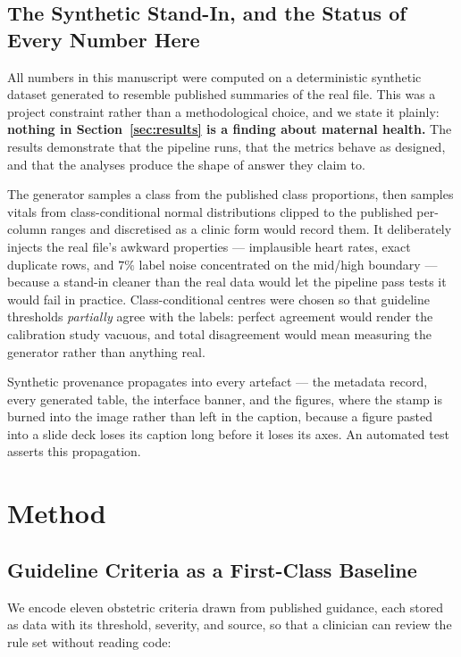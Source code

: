 \documentclass[journal]{IEEEtran}
\begin{document}
\subsection{The Synthetic Stand-In, and the Status of Every Number Here}
\label{sec:synthetic}

All numbers in this manuscript were computed on a deterministic synthetic
dataset generated to resemble published summaries of the real file. This was a
project constraint rather than a methodological choice, and we state it plainly:
\textbf{nothing in Section~\ref{sec:results} is a finding about maternal
health.} The results demonstrate that the pipeline runs, that the metrics behave
as designed, and that the analyses produce the shape of answer they claim to.

The generator samples a class from the published class proportions, then samples
vitals from class-conditional normal distributions clipped to the published
per-column ranges and discretised as a clinic form would record them. It
deliberately injects the real file's awkward properties --- implausible heart
rates, exact duplicate rows, and $7\%$ label noise concentrated on the mid/high
boundary --- because a stand-in cleaner than the real data would let the
pipeline pass tests it would fail in practice. Class-conditional centres were
chosen so that guideline thresholds \emph{partially} agree with the labels:
perfect agreement would render the calibration study vacuous, and total
disagreement would mean measuring the generator rather than anything real.

Synthetic provenance propagates into every artefact --- the metadata record,
every generated table, the interface banner, and the figures, where the stamp is
burned into the image rather than left in the caption, because a figure pasted
into a slide deck loses its caption long before it loses its axes. An automated
test asserts this propagation.

\section{Method}

\subsection{Guideline Criteria as a First-Class Baseline}
\label{sec:baseline}

We encode eleven obstetric criteria drawn from published guidance, each stored
as data with its threshold, severity, and source, so that a clinician can review
the rule set without reading code:
\end{document}
